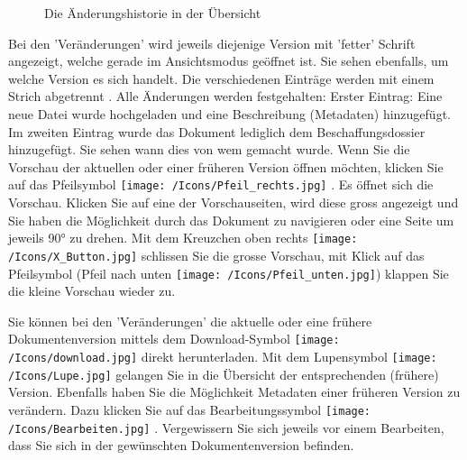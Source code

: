 \begin{figure}[H]
\caption{Die Änderungshistorie in der Übersicht}
\end{figure}

 Bei den 'Veränderungen' wird jeweils diejenige Version mit 'fetter' Schrift angezeigt, welche gerade im Ansichtsmodus geöffnet ist. Sie sehen ebenfalls, um welche Version es sich handelt. Die verschiedenen Einträge werden mit einem Strich abgetrennt . Alle Änderungen werden festgehalten: Erster Eintrag: Eine neue Datei wurde hochgeladen und eine Beschreibung (Metadaten) hinzugefügt. Im zweiten Eintrag wurde das Dokument lediglich dem Beschaffungsdossier hinzugefügt. Sie sehen wann dies von wem gemacht wurde. Wenn Sie die Vorschau der aktuellen oder einer früheren Version öffnen möchten, klicken Sie auf das Pfeilsymbol \texttt{[image: /Icons/Pfeil\_rechts.jpg]} . Es öffnet sich die Vorschau. Klicken Sie auf eine der Vorschauseiten, wird diese gross angezeigt und Sie haben die Möglichkeit durch das Dokument zu navigieren oder eine Seite um jeweils 90° zu drehen. Mit dem Kreuzchen oben rechts \texttt{[image: /Icons/X\_Button.jpg]} schlissen Sie die grosse Vorschau, mit Klick auf das Pfeilsymbol (Pfeil nach unten \texttt{[image: /Icons/Pfeil\_unten.jpg]}) klappen Sie die kleine Vorschau wieder zu.

Sie können bei den 'Veränderungen' die aktuelle oder eine frühere Dokumentenversion mittels dem Download-Symbol \texttt{[image: /Icons/download.jpg]}  direkt herunterladen. Mit dem Lupensymbol \texttt{[image: /Icons/Lupe.jpg]}  gelangen Sie in die Übersicht der entsprechenden (frühere) Version. Ebenfalls haben Sie die Möglichkeit Metadaten einer früheren Version zu verändern. Dazu klicken Sie auf das Bearbeitungssymbol \texttt{[image: /Icons/Bearbeiten.jpg]} . Vergewissern Sie sich jeweils vor einem Bearbeiten, dass Sie sich in der gewünschten Dokumentenversion befinden.

